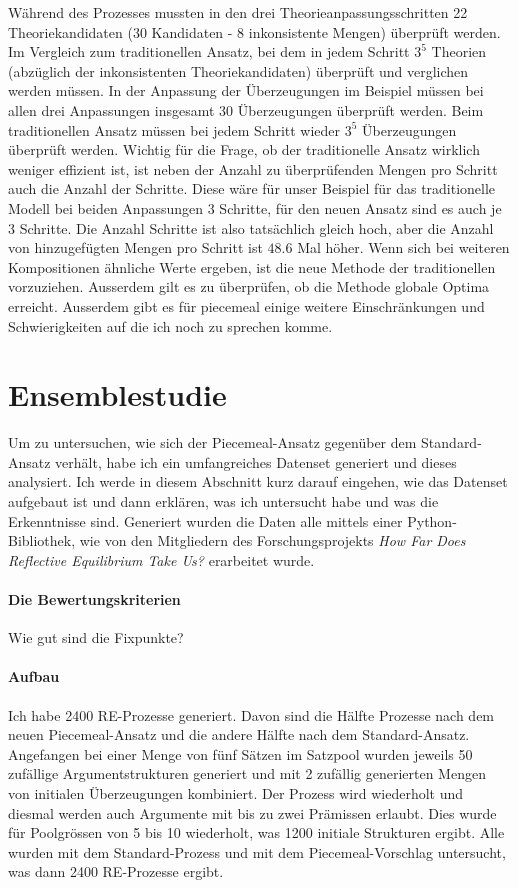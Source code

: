\documentclass{article}
\begin{document}
 Während des Prozesses mussten in den drei Theorieanpassungsschritten 22 Theoriekandidaten (30 Kandidaten - 8 inkonsistente Mengen) überprüft werden.  Im Vergleich zum traditionellen Ansatz, bei dem in jedem Schritt $3^5$ Theorien (abzüglich der inkonsistenten Theoriekandidaten) überprüft und verglichen werden müssen. In der Anpassung der Überzeugungen im Beispiel müssen bei allen drei Anpassungen insgesamt 30 Überzeugungen überprüft werden. Beim traditionellen Ansatz müssen bei jedem Schritt wieder $3^5$ Überzeugungen überprüft werden. Wichtig für die Frage, ob der traditionelle Ansatz wirklich weniger effizient ist, ist neben der Anzahl zu überprüfenden Mengen pro Schritt auch die Anzahl der Schritte. Diese wäre für unser Beispiel für das traditionelle Modell bei beiden Anpassungen 3 Schritte, für den neuen Ansatz sind es auch je 3 Schritte. Die Anzahl Schritte ist also tatsächlich gleich hoch, aber die Anzahl von hinzugefügten Mengen pro Schritt ist $48.6$ Mal höher. Wenn sich bei weiteren Kompositionen ähnliche Werte ergeben, ist die neue Methode der traditionellen vorzuziehen. Ausserdem gilt es zu überprüfen, ob die Methode globale Optima erreicht. Ausserdem gibt es für piecemeal einige weitere Einschränkungen und Schwierigkeiten auf die ich noch zu sprechen komme.

\section{Ensemblestudie} \label{Ensemblestudie}

Um zu untersuchen, wie sich der Piecemeal-Ansatz gegenüber dem Standard-Ansatz verhält, habe ich ein umfangreiches Datenset generiert und dieses analysiert. Ich werde in diesem Abschnitt kurz darauf eingehen, wie das Datenset aufgebaut ist und dann erklären, was ich untersucht habe und was die Erkenntnisse sind. Generiert wurden die Daten alle mittels einer Python-Bibliothek, wie von den Mitgliedern des Forschungsprojekts \textit{How Far Does Reflective Equilibrium Take Us?} erarbeitet wurde.

\paragraph{Die Bewertungskriterien} Wie gut sind die Fixpunkte? 

\paragraph{Aufbau} Ich habe 2400 RE-Prozesse generiert. Davon sind die Hälfte Prozesse nach dem neuen Piecemeal-Ansatz und die andere Hälfte nach dem Standard-Ansatz. Angefangen bei einer Menge von fünf Sätzen im Satzpool wurden jeweils 50 zufällige Argumentstrukturen generiert und mit 2 zufällig generierten Mengen von initialen Überzeugungen kombiniert. Der Prozess wird wiederholt und diesmal werden auch Argumente mit bis zu zwei Prämissen erlaubt. Dies wurde für Poolgrössen von 5 bis 10 wiederholt, was 1200 initiale Strukturen ergibt. Alle wurden mit dem Standard-Prozess und mit dem Piecemeal-Vorschlag untersucht, was dann 2400 RE-Prozesse ergibt.
\end{document}

